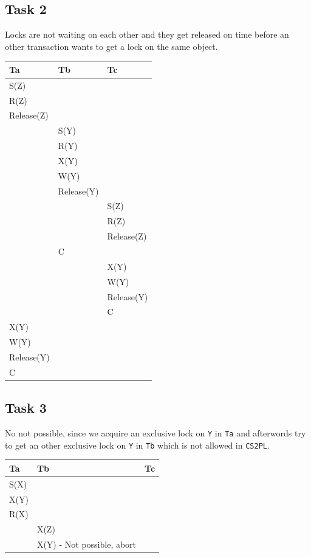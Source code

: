 \documentclass[12pt,a4paper]{article}
\begin{document}
\subsection{Task 2}
Locks are not waiting on each other and they get released on time before an other transaction wants to get a lock on the same object.
\begin{table}[!htbp]
    \centering
    \begin{tabularx}{\textwidth}{l|l|l}
        \hline
        Ta & Tb & Tc \\ 
        \hline
        S(Z) &  &  \\
        R(Z) &  &  \\
        Release(Z) &  &  \\        
             & S(Y) & \\
             & R(Y) & \\
             & X(Y) & \\             
             & W(Y) & \\
			 & Release(Y) & \\
             &  & S(Z)\\             
        	 &  & R(Z)\\
			& & Release(Z) \\        	 
       		& C & \\        	 
        	& & X(Y) \\       		
        	& & W(Y) \\
			& & Release(Y) \\
        	& & C \\ 
		X(Y) & &  \\  
        W(Y) & &  \\ 
		Release(Y) & &  \\ 
        C & &  \\   
        \hline
    \end{tabularx}
\end{table}
\subsection{Task 3}
No not possible, since we acquire an exclusive lock on \texttt{Y} in \texttt{Ta} and afterwords try to get an other exclusive lock on \texttt{Y} in \texttt{Tb} which is not allowed in \texttt{CS2PL}.
\begin{table}[!htbp]
    \centering
    \begin{tabularx}{\textwidth}{l|l|l}
        \hline
        Ta & Tb & Tc \\ 
        \hline
        S(X) &  &  \\
        X(Y) &  &  \\
        R(X) &  &  \\
        	 & X(Z) &  \\
   			 & X(Y) - Not possible, abort &  \\          
        \hline
    \end{tabularx}
\end{table}
\end{document}
